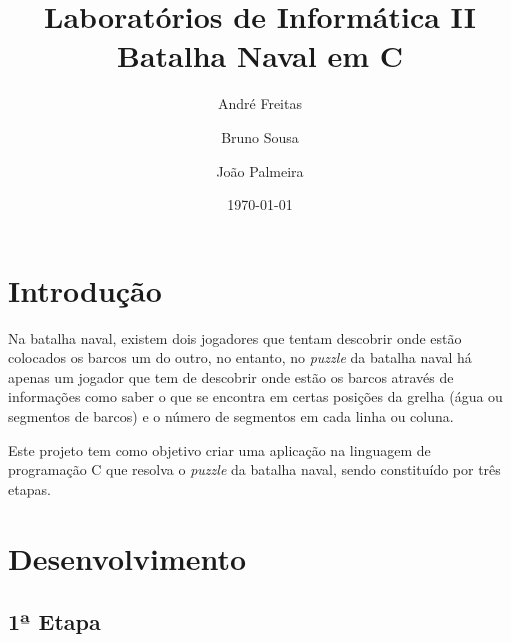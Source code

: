 \documentclass[12pt,a4paper,portuges]{article}
\begin{document}
\title{\textbf{Laboratórios de Informática II Batalha Naval em C}}
\author{André Freitas \and Bruno Sousa \and João Palmeira}
\date{\today}
\maketitle

\newpage

\tableofcontents

\newpage

\section{\textbf{Introdução}}

Na batalha naval, existem dois jogadores que tentam descobrir onde estão colocados os barcos um do outro, no entanto, no \textit{puzzle} da batalha naval há apenas um jogador que tem de descobrir onde estão os barcos através de informações como saber o que se encontra em certas posições da grelha (água ou segmentos de barcos) e o número de segmentos em cada linha ou coluna. 

Este projeto tem como objetivo criar uma aplicação na linguagem de programação C que resolva o \textit{puzzle} da batalha naval, sendo constituído por três etapas.

\newpage

\section{\textbf{Desenvolvimento}}

\subsection{\textbf{1ª Etapa}}
\end{document}
